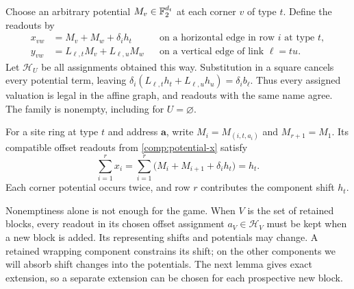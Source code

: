 Choose an arbitrary potential $M_v\in\mathbb{F}_2^{d_t}$ at each corner $v$ of
type $t$.  Define the readouts by
\begin{align}
 x_{vw}&=M_v+M_w+\delta_i h_t
   &&\text{on a horizontal edge in row $i$ at type $t$},
   \label{comp:potential-x}\\
 y_{vw}&=L_{\ell,t}M_v+L_{\ell,u}M_w
   &&\text{on a vertical edge of link $\ell=tu$}.
   \label{comp:potential-y}
\end{align}
Let $\mathcal H_U$ be all assignments obtained this way.  Substitution
in a square cancels every potential term, leaving
$\delta_i(L_{\ell,t}h_t+L_{\ell,u}h_u)=\delta_i b_\ell$.
Thus every assigned valuation is legal in the affine graph, and readouts
with the same name agree.  The family is nonempty, including for
$U=\varnothing$.

For a site ring at type $t$ and address $\mathbf a$, write
$M_i=M_{(i,t,a_i)}$ and $M_{r+1}=M_1$.  Its compatible offset
readouts from \eqref{comp:potential-x} satisfy
\[
 \sum_{i=1}^r x_i
 =\sum_{i=1}^r\bigl(M_i+M_{i+1}+\delta_i h_t\bigr)
 =h_t.
\]
Each corner potential occurs twice, and row $r$ contributes the
component shift $h_t$.

Nonemptiness alone is not enough for the game.  When $V$ is the set of
retained blocks, every readout in its chosen offset assignment
$a_V\in\mathcal H_V$ must be kept when a new block is added.  Its
representing shifts and potentials may change.  A retained wrapping
component constrains its shift; on the other components we will absorb
shift changes into the potentials.  The next lemma gives exact extension,
so a separate extension can be chosen for each prospective new block.

